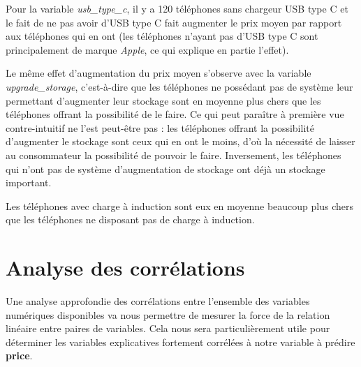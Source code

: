 \documentclass[
  12pt,
]{report}
\begin{document}
Pour la variable \emph{usb\_type\_c}, il y a 120 téléphones sans
chargeur USB type C et le fait de ne pas avoir d'USB type C fait
augmenter le prix moyen par rapport aux téléphones qui en ont (les
téléphones n'ayant pas d'USB type C sont principalement de marque
\emph{Apple}, ce qui explique en partie l'effet).

Le même effet d'augmentation du prix moyen s'observe avec la variable
\emph{upgrade\_storage}, c'est-à-dire que les téléphones ne possédant
pas de système leur permettant d'augmenter leur stockage sont en moyenne
plus chers que les téléphones offrant la possibilité de le faire. Ce qui
peut paraître à première vue contre-intuitif ne l'est peut-être pas :
les téléphones offrant la possibilité d'augmenter le stockage sont ceux
qui en ont le moins, d'où la nécessité de laisser au consommateur la
possibilité de pouvoir le faire. Inversement, les téléphones qui n'ont
pas de système d'augmentation de stockage ont déjà un stockage
important.

Les téléphones avec charge à induction sont eux en moyenne beaucoup plus
chers que les téléphones ne disposant pas de charge à induction.

\newpage

\section{Analyse des corrélations}\label{analyse-des-corruxe9lations}

Une analyse approfondie des corrélations entre l'ensemble des variables
numériques disponibles va nous permettre de mesurer la force de la
relation linéaire entre paires de variables. Cela nous sera
particulièrement utile pour déterminer les variables explicatives
fortement corrélées à notre variable à prédire \textbf{price}.
\end{document}
